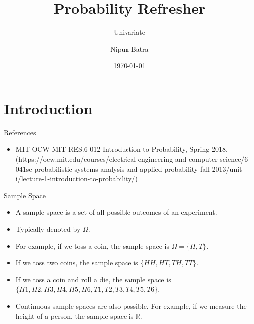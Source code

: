 \documentclass[handout]{beamer}
\begin{document}
\title{Probability Refresher}
\subtitle{Univariate}
\author{Nipun Batra}
\date{\today}
\maketitle

\section{Introduction}

\begin{frame}{References}
\begin{itemize}
\item MIT OCW MIT RES.6-012 Introduction to Probability, Spring 2018. (https://ocw.mit.edu/courses/electrical-engineering-and-computer-science/6-041sc-probabilistic-systems-analysis-and-applied-probability-fall-2013/unit-i/lecture-1-introduction-to-probability/)
\end{itemize}
    
\end{frame}

\begin{frame}{Sample Space}
\begin{itemize}
\item A sample space is a set of all possible outcomes of an experiment.
\item Typically denoted by $\Omega$.
\item For example, if we toss a coin, the sample space is  $\Omega = \{H, T\}$.
\item If we toss two coins, the sample space is $\{HH, HT, TH, TT\}$.
\item If we toss a coin and roll a die, the sample space is $\{H1, H2, H3, H4, H5, H6, T1, T2, T3, T4, T5, T6\}$.
\item Continuous sample spaces are also possible. For example, if we measure the height of a person, the sample space is $\mathbb{R}$.
\end{itemize}
\end{frame}
\end{document}
